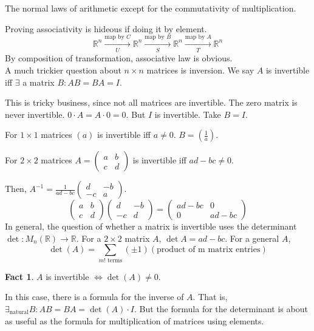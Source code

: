 \documentclass[12pt]{article}
\newcommand{\RR}{\mathbb{R}}
\theoremstyle{definition}
\newtheorem*{fact}{Fact}
\begin{document}
The normal laws of arithmetic except for the commutativity of multiplication.

Proving associativity is hideous if doing it by element.
\[\RR^n\xrightarrow[U]{\text{map by } C}\RR^n\xrightarrow[S]{\text{map by } B}\RR^n\xrightarrow[T]{\text{map by } A}\RR^n\]
By composition of transformation, associative law is obvious.
\\

A much trickier question about \(n \times n\) matrices is inversion.
We say \(A\) is invertible iff \(\exists \) a matrix \(B : AB = BA = I\).

This is tricky business, since not all matrices are invertible. The zero matrix is never invertible.
\( 0\cdot A = A \cdot 0 = 0\). But \(I\) is invertible. Take \(B=I\).

For \(1 \times 1\) matrices \((a)\) is invertible iff \(a \neq 0\). \(B = (\frac{1}{a})\).

For \(2 \times 2\) matrices \(A = \left(\begin{smallmatrix}
    a & b\\
    c & d
\end{smallmatrix}\right)\) is invertible iff \(ad - bc \neq 0\).

Then, \(A^{-1}=\frac{1}{ad-bc}\left(\begin{smallmatrix}
    d & -b\\
    -c & a
\end{smallmatrix}\right)\).
\[
\begin{pmatrix}
    a & b\\
    c & d
\end{pmatrix}
\begin{pmatrix}
    d & -b\\
    -c & d
\end{pmatrix}
=
\begin{pmatrix}
    ad-bc & 0\\
    0 & ad-bc 
\end{pmatrix}
\]
In general, the question of whether a matrix is invertible
uses the determinant \(\det : M_n(\RR)\rightarrow\RR \).
For a \(2 \times 2\) matrix \(A\), \(\det A = ad-bc\).
For a general \(A\), \[\det(A) = \sum_{m! \text{ terms}}(\pm1)(\text{product of m matrix entries})\]
\begin{fact}
\(A\) is invertible \(\iff \det(A)\neq 0\).
\end{fact}
In this case, there is a formula for the inverse of \(A\).
That is, \(\exists_{\text{natural}} B: AB = BA = \det(A)\cdot I\).
But the formula for the determinant is about as useful as the formula
for multiplication of matrices using elements.
\end{document}
